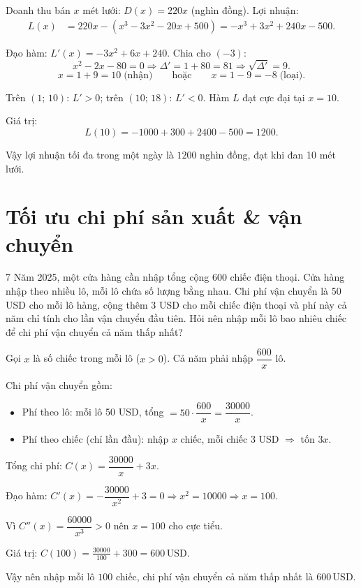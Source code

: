 \begin{loigiai}
Doanh thu bán $x$ mét lưới: $D(x) = 220x$ (nghìn đồng). Lợi nhuận:
\begin{align*}
L(x) &= 220x - (x^3 - 3x^2 - 20x + 500) = -x^3 + 3x^2 + 240x - 500.
\end{align*}

Đạo hàm: $L'(x) = -3x^2 + 6x + 240$. Chia cho $(-3)$:
\[ x^2 - 2x - 80 = 0 \Rightarrow \Delta' = 1 + 80 = 81 \Rightarrow \sqrt{\Delta'} = 9. \]
\[ x = 1 + 9 = 10 \;\text{(nhận)} \qquad \text{hoặc} \qquad x = 1 - 9 = -8\;\text{(loại)}. \]


Trên $(1;\,10)$: $L' > 0$; trên $(10;\,18)$: $L' < 0$. Hàm $L$ đạt cực đại tại $x = 10$.

Giá trị:
\[
L(10) = -1000 + 300 + 2400 - 500 = 1200.
\]

Vậy lợi nhuận tối đa trong một ngày là $\boxed{1200}$ nghìn đồng, đạt khi đan 10 mét lưới.
\end{loigiai}

\separator

\section{Tối ưu chi phí sản xuất \& vận chuyển}

\begin{baitoan}{7 \hfill {}}
Năm 2025, một cửa hàng cần nhập tổng cộng 600 chiếc điện thoại. Cửa hàng nhập theo nhiều lô, mỗi lô chứa số lượng bằng nhau. Chi phí vận chuyển là 50 USD cho mỗi lô hàng, cộng thêm 3 USD cho mỗi chiếc điện thoại và phí này cả năm chỉ tính cho lần vận chuyển đầu tiên. Hỏi nên nhập mỗi lô bao nhiêu chiếc để chi phí vận chuyển cả năm thấp nhất?
\end{baitoan}

\begin{loigiai}
Gọi $x$ là số chiếc trong mỗi lô ($x > 0$). Cả năm phải nhập $\dfrac{600}{x}$ lô.

Chi phí vận chuyển gồm:
\begin{itemize}
  \item Phí theo lô: mỗi lô 50 USD, tổng $= 50 \cdot \dfrac{600}{x} = \dfrac{30000}{x}$.
  \item Phí theo chiếc (chỉ lần đầu): nhập $x$ chiếc, mỗi chiếc 3 USD $\Rightarrow$ tốn $3x$.
\end{itemize}

Tổng chi phí: $C(x) = \dfrac{30000}{x} + 3x$.

Đạo hàm: $C'(x) = -\dfrac{30000}{x^2} + 3 = 0 \Rightarrow x^2 = 10000 \Rightarrow x = 100$.

Vì $C''(x) = \dfrac{60000}{x^3} > 0$ nên $x = 100$ cho cực tiểu.


Giá trị: $C(100) = \frac{30000}{100} + 300 = 600$\,USD.

Vậy nên nhập mỗi lô $\boxed{100}$ chiếc, chi phí vận chuyển cả năm thấp nhất là 600\,USD.
\end{loigiai}

